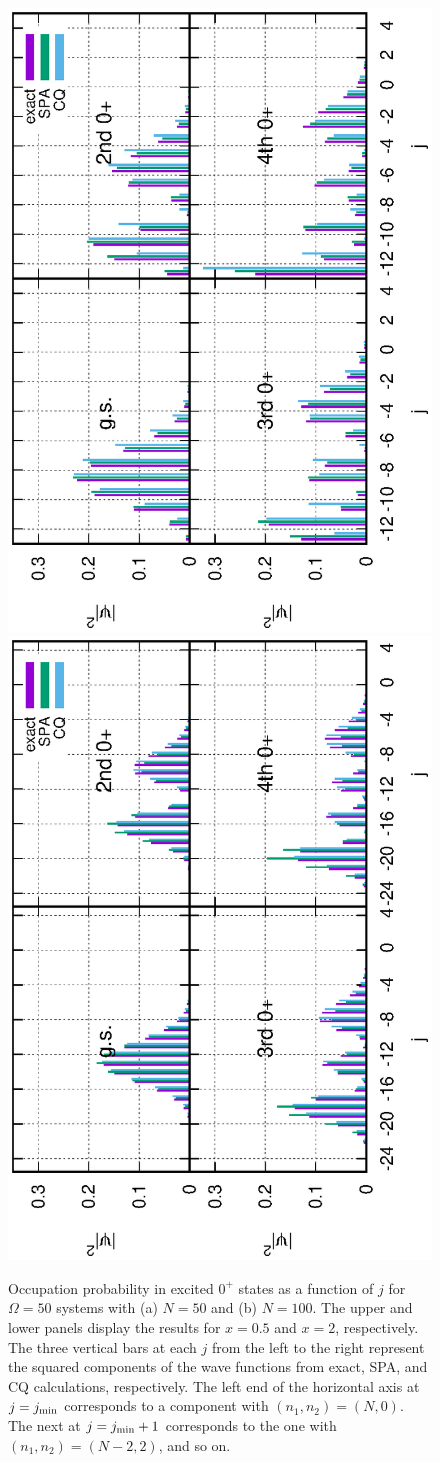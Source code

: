 \documentclass[%
superscriptaddress,
preprint,
showpacs,
nofootinbib,
amsmath,amssymb,
aps,
prc,
floatfix ]%
{revtex4-1}
\begin{document}
\begin{figure}[t]
\begin{minipage}{1\hsize}
\begin{center}
\hspace{13pt}
\includegraphics[height=0.45\textwidth,angle=-90]{N50Xeq2occ_wo_adiabatic.eps}
\hspace{13pt}\includegraphics[height=0.45\textwidth,angle=-90]{N100Xeq2occ_wo_adiabatic.eps}
 \end{center}
 \end{minipage}
 \caption{
Occupation probability in excited $0^+$ states
as a function of $j$ for $\Omega=50$ systems
with (a) $N=50$ and (b) $N=100$.
The upper and lower panels display the results for $x=0.5$ and $x=2$,
respectively. 
The three vertical bars at each $j$ from the left to the right represent
the squared components of the wave functions
from exact, SPA, and CQ calculations, respectively.
The left end of the horizontal axis at $j=j_{\rm min}$
corresponds to a component with $(n_1,n_2)=(N,0)$.
The next at $j=j_{\rm min}+1$ corresponds to the one with
$(n_1,n_2)=(N-2,2)$, and so on.
}
 \label{fig:N50_occ}
\end{figure}
\end{document}
